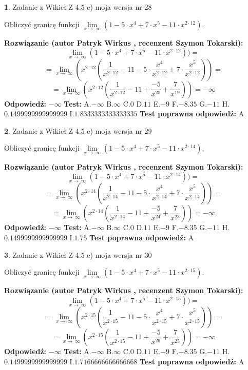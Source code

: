 \documentclass[12pt, a4paper]{article}
\theoremstyle{definition} %
\newtheorem{zad}{}
\newcommand{\zadStart}[1]{\begin{zad}#1\newline}
\newcommand{\zadStop}{\end{zad}}
\newcommand{\rozwStart}[2]{\noindent \textbf{Rozwiązanie (autor #1 , recenzent #2): }\newline}
\newcommand{\rozwStop}{\newline}
\newcommand{\odpStart}{\noindent \textbf{Odpowiedź:}\newline}
\newcommand{\odpStop}{\newline}
\newcommand{\testStart}{\noindent \textbf{Test:}\newline}
\newcommand{\testStop}{\newline}
\newcommand{\kluczStart}{\noindent \textbf{Test poprawna odpowiedź:}\newline}
\newcommand{\kluczStop}{\newline}
\begin{document}
\zadStart{Zadanie z Wikieł Z 4.5 e) moja wersja nr 28}


Obliczyć granicę funkcji  $\lim\limits_{x\to\ \infty}(1 - 5 \cdot x^{4}+7 \cdot x^{5}- 11 \cdot x^{2\cdot12})$.
\zadStop
\rozwStart{Patryk Wirkus}{Szymon Tokarski}
$$\lim\limits_{x\to\ \infty}(1 - 5 \cdot x^{4}+7 \cdot x^{5}- 11 \cdot x^{2\cdot12}))=$$
$$=\lim\limits_{x\to\ \infty}(x^{2\cdot12}(\frac{1}{x^{2\cdot12}}-11 -5 \cdot \frac{x^{4}}{x^{2\cdot12}}+7 \cdot \frac{x^{5}}{x^{2\cdot12}}))=$$
$$=\lim\limits_{x\to\ \infty}(x^{2\cdot12}(\frac{1}{x^{2\cdot12}}-11 + \frac{-5}{x^{20}}+ \frac{7}{x^{19}}))=-\infty$$
\rozwStop
\odpStart
$-\infty$
\odpStop
\testStart
A.$-\infty$ B.$\infty$ C.$0$ D.$11$ E.$-9$
F.$-8.35$ G.$-11$
H.$0.1499999999999999$
I.$1.8333333333333335$
\testStop
\kluczStart
A
\kluczStop



\zadStart{Zadanie z Wikieł Z 4.5 e) moja wersja nr 29}


Obliczyć granicę funkcji  $\lim\limits_{x\to\ \infty}(1 - 5 \cdot x^{4}+7 \cdot x^{5}- 11 \cdot x^{2\cdot14})$.
\zadStop
\rozwStart{Patryk Wirkus}{Szymon Tokarski}
$$\lim\limits_{x\to\ \infty}(1 - 5 \cdot x^{4}+7 \cdot x^{5}- 11 \cdot x^{2\cdot14}))=$$
$$=\lim\limits_{x\to\ \infty}(x^{2\cdot14}(\frac{1}{x^{2\cdot14}}-11 -5 \cdot \frac{x^{4}}{x^{2\cdot14}}+7 \cdot \frac{x^{5}}{x^{2\cdot14}}))=$$
$$=\lim\limits_{x\to\ \infty}(x^{2\cdot14}(\frac{1}{x^{2\cdot14}}-11 + \frac{-5}{x^{24}}+ \frac{7}{x^{23}}))=-\infty$$
\rozwStop
\odpStart
$-\infty$
\odpStop
\testStart
A.$-\infty$ B.$\infty$ C.$0$ D.$11$ E.$-9$
F.$-8.35$ G.$-11$
H.$0.1499999999999999$
I.$1.75$
\testStop
\kluczStart
A
\kluczStop



\zadStart{Zadanie z Wikieł Z 4.5 e) moja wersja nr 30}


Obliczyć granicę funkcji  $\lim\limits_{x\to\ \infty}(1 - 5 \cdot x^{4}+7 \cdot x^{5}- 11 \cdot x^{2\cdot15})$.
\zadStop
\rozwStart{Patryk Wirkus}{Szymon Tokarski}
$$\lim\limits_{x\to\ \infty}(1 - 5 \cdot x^{4}+7 \cdot x^{5}- 11 \cdot x^{2\cdot15}))=$$
$$=\lim\limits_{x\to\ \infty}(x^{2\cdot15}(\frac{1}{x^{2\cdot15}}-11 -5 \cdot \frac{x^{4}}{x^{2\cdot15}}+7 \cdot \frac{x^{5}}{x^{2\cdot15}}))=$$
$$=\lim\limits_{x\to\ \infty}(x^{2\cdot15}(\frac{1}{x^{2\cdot15}}-11 + \frac{-5}{x^{26}}+ \frac{7}{x^{25}}))=-\infty$$
\rozwStop
\odpStart
$-\infty$
\odpStop
\testStart
A.$-\infty$ B.$\infty$ C.$0$ D.$11$ E.$-9$
F.$-8.35$ G.$-11$
H.$0.1499999999999999$
I.$1.7166666666666668$
\testStop
\kluczStart
A
\kluczStop
\end{document}
